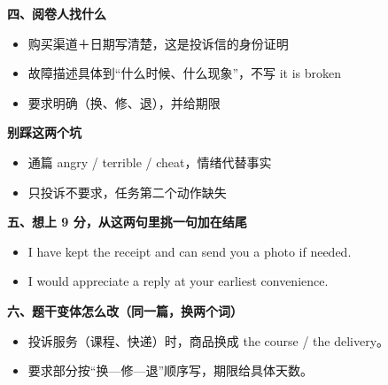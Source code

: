 \documentclass[11pt,a4paper]{ctexart}
\begin{document}
\vspace{5pt}
\noindent\begin{minipage}[t]{0.555\linewidth}
{\color{accent}\bfseries 四、阅卷人找什么}\par
{\footnotesize\begin{itemize}[leftmargin=1.2em,itemsep=1pt,topsep=1pt,parsep=0pt]\setlength{\leftmargin}{1.1em}
\item 购买渠道＋日期写清楚，这是投诉信的身份证明
\item 故障描述具体到“什么时候、什么现象”，不写 it is broken
\item 要求明确（换、修、退），并给期限
\end{itemize}}
\end{minipage}\hfill
\begin{minipage}[t]{0.415\linewidth}
{\color{hot}\bfseries 别踩这两个坑}\par
{\footnotesize\begin{itemize}[leftmargin=1.2em,itemsep=1pt,topsep=1pt,parsep=0pt]\setlength{\leftmargin}{1.1em}
\item 通篇 angry / terrible / cheat，情绪代替事实
\item 只投诉不要求，任务第二个动作缺失
\end{itemize}}
\end{minipage}\par

\vspace{6pt}
{\color{accent}\bfseries 五、想上 9 分，从这两句里挑一句加在结尾}\par
\vspace{2pt}
{\footnotesize
\begin{itemize}[leftmargin=1.2em,itemsep=1.5pt,topsep=1pt,parsep=0pt]
\item I have kept the receipt and can send you a photo if needed.
\item I would appreciate a reply at your earliest convenience.
\end{itemize}}\par

\vspace{6pt}
{\color{accent}\bfseries 六、题干变体怎么改（同一篇，换两个词）}\par
\vspace{2pt}
{\footnotesize
\begin{itemize}[leftmargin=1.2em,itemsep=1.5pt,topsep=1pt,parsep=0pt]
\item 投诉服务（课程、快递）时，商品换成 the course / the delivery。
\item 要求部分按“换—修—退”顺序写，期限给具体天数。
\end{itemize}}\par
\end{document}
